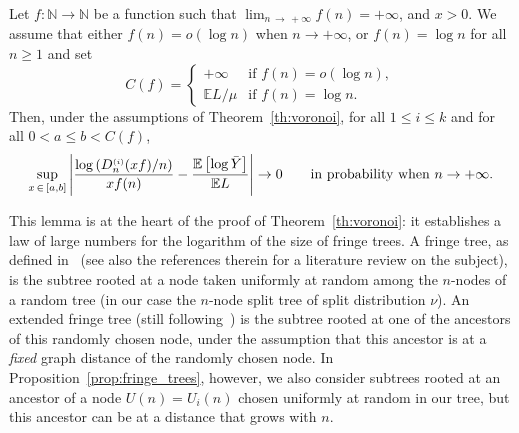 \documentclass[10pt]{amsart}
\theoremstyle{definition}\newtheorem{defi}[theo]{Definition}\newtheorem{rema}[theo]{Remark}\newtheorem{exam}[theo]{Example}\newtheorem{exem}[theo]{Example}\newtheorem{nota}[theo]{Notation}
\newcommand{\sss}{\ensuremath{\scriptscriptstyle}}
\newcommand{\bbE}{\mathbb{E}}
\newcommand{\bbN}{\mathbb{N}}
\begin{document}
\begin{prop}\label{prop:fringe_trees}
Let $f\colon \bbN\to \bbN$ be a function such that $\lim_{n\,\to\,+\infty}f(n)=+\infty$, and $x> 0$. We assume that either $f(n) = o(\log n)$ when $n\to+\infty$, or $f(n) = \log n$ for all $n\geq 1$ and set
\[
C(f)=
\begin{cases}+\infty &\text{if }f(n)=o(\log n),\\\bbE L/\mu&\text{if }f(n)=\log n.
\end{cases}
\]
Then, under the assumptions of Theorem~\ref{th:voronoi}, for all $1\leq i\leq k$ and for all $0<a\leq b<C(f)$,
\begin{equation}\label{eq:fringe_trees}
\sup_{x\,\in\,[a,b]} \left|\frac{\log \left(D_n^{\sss (i)}(xf)/n\right)}{xf(n)}- \frac{\bbE\left[\log \bar Y\right]}{\bbE L}\right|\to 0
\qquad\text{in probability when }n\to+\infty.
\end{equation}
\end{prop}

This lemma is at the heart of the proof of Theorem~\ref{th:voronoi}: it establishes a law of large numbers for the logarithm of the size of fringe trees. A fringe tree, as defined in~\cite{JansonHolm} (see also the references therein for a literature review on the subject), is the subtree rooted at a node taken uniformly at random among the $n$-nodes of a random tree (in our case the $n$-node split tree of split distribution $\nu$). An extended fringe tree (still following~\cite{JansonHolm}) is the subtree rooted at one of the ancestors of this randomly chosen node, under the assumption that this ancestor is at a \emph{fixed} graph distance of the randomly chosen node. In Proposition~\ref{prop:fringe_trees}, however, we also consider subtrees rooted at an ancestor of a node $U(n) = U_i(n)$ chosen uniformly at random in our tree, but this ancestor can be at a distance that grows with $n$.
\end{document}

